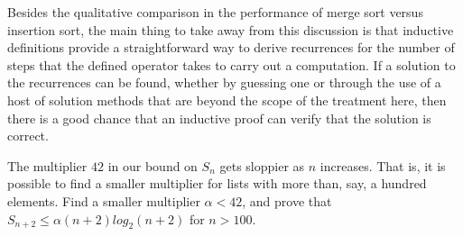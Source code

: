 Besides the qualitative comparison in the performance of merge sort
versus insertion sort, the main thing to take away from this discussion
is that inductive definitions provide a straightforward way to
derive recurrences for the number of steps that the defined operator
takes to carry out a computation.
If a solution to the recurrences can be found,
whether by guessing one or through the use of a host of solution methods
that are beyond the scope of the treatment here, then there is a good
chance that an inductive proof
can verify that the solution is correct.

\begin{ExerciseList}

\Exercise
The multiplier $42$ in our bound on $S_n$ gets sloppier as $n$ increases.
That is, it is possible to find a smaller multiplier
for lists with more than, say, a hundred elements.
Find a smaller multiplier $\alpha < 42$, and prove that
$S_{n+2} \leq \alpha(n+2)log_2(n+2)$ for $n > 100$.

\end{ExerciseList} 